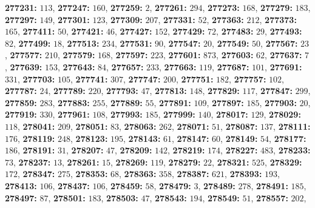\textsf{\bfseries 277231:} $113$, \textsf{\bfseries 277247:} $160$, \textsf{\bfseries 277259:} $2$, \textsf{\bfseries 277261:} $294$, \textsf{\bfseries 277273:} $168$, \textsf{\bfseries 277279:} $183$, \textsf{\bfseries 277297:} $149$, \textsf{\bfseries 277301:} $123$, \textsf{\bfseries 277309:} $207$, \textsf{\bfseries 277331:} $52$, \textsf{\bfseries 277363:} $212$, \textsf{\bfseries 277373:} $165$, \textsf{\bfseries 277411:} $50$, \textsf{\bfseries 277421:} $46$, \textsf{\bfseries 277427:} $152$, \textsf{\bfseries 277429:} $72$, \textsf{\bfseries 277483:} $29$, \textsf{\bfseries 277493:} $82$, \textsf{\bfseries 277499:} $18$, \textsf{\bfseries 277513:} $234$, \textsf{\bfseries 277531:} $90$, \textsf{\bfseries 277547:} $20$, \textsf{\bfseries 277549:} $50$, \textsf{\bfseries 277567:} $23$, \textsf{\bfseries 277577:} $210$, \textsf{\bfseries 277579:} $168$, \textsf{\bfseries 277597:} $223$, \textsf{\bfseries 277601:} $873$, \textsf{\bfseries 277603:} $62$, \textsf{\bfseries 277637:} $7$, \textsf{\bfseries 277639:} $153$, \textsf{\bfseries 277643:} $84$, \textsf{\bfseries 277657:} $233$, \textsf{\bfseries 277663:} $119$, \textsf{\bfseries 277687:} $101$, \textsf{\bfseries 277691:} $331$, \textsf{\bfseries 277703:} $105$, \textsf{\bfseries 277741:} $307$, \textsf{\bfseries 277747:} $200$, \textsf{\bfseries 277751:} $182$, \textsf{\bfseries 277757:} $102$, \textsf{\bfseries 277787:} $24$, \textsf{\bfseries 277789:} $220$, \textsf{\bfseries 277793:} $47$, \textsf{\bfseries 277813:} $148$, \textsf{\bfseries 277829:} $117$, \textsf{\bfseries 277847:} $299$, \textsf{\bfseries 277859:} $283$, \textsf{\bfseries 277883:} $255$, \textsf{\bfseries 277889:} $55$, \textsf{\bfseries 277891:} $109$, \textsf{\bfseries 277897:} $185$, \textsf{\bfseries 277903:} $20$, \textsf{\bfseries 277919:} $330$, \textsf{\bfseries 277961:} $108$, \textsf{\bfseries 277993:} $185$, \textsf{\bfseries 277999:} $140$, \textsf{\bfseries 278017:} $129$, \textsf{\bfseries 278029:} $118$, \textsf{\bfseries 278041:} $209$, \textsf{\bfseries 278051:} $83$, \textsf{\bfseries 278063:} $262$, \textsf{\bfseries 278071:} $51$, \textsf{\bfseries 278087:} $137$, \textsf{\bfseries 278111:} $176$, \textsf{\bfseries 278119:} $248$, \textsf{\bfseries 278123:} $195$, \textsf{\bfseries 278143:} $61$, \textsf{\bfseries 278147:} $60$, \textsf{\bfseries 278149:} $54$, \textsf{\bfseries 278177:} $186$, \textsf{\bfseries 278191:} $31$, \textsf{\bfseries 278207:} $47$, \textsf{\bfseries 278209:} $142$, \textsf{\bfseries 278219:} $174$, \textsf{\bfseries 278227:} $483$, \textsf{\bfseries 278233:} $73$, \textsf{\bfseries 278237:} $13$, \textsf{\bfseries 278261:} $15$, \textsf{\bfseries 278269:} $119$, \textsf{\bfseries 278279:} $22$, \textsf{\bfseries 278321:} $525$, \textsf{\bfseries 278329:} $172$, \textsf{\bfseries 278347:} $275$, \textsf{\bfseries 278353:} $68$, \textsf{\bfseries 278363:} $358$, \textsf{\bfseries 278387:} $621$, \textsf{\bfseries 278393:} $193$, \textsf{\bfseries 278413:} $106$, \textsf{\bfseries 278437:} $106$, \textsf{\bfseries 278459:} $58$, \textsf{\bfseries 278479:} $3$, \textsf{\bfseries 278489:} $278$, \textsf{\bfseries 278491:} $185$, \textsf{\bfseries 278497:} $87$, \textsf{\bfseries 278501:} $183$, \textsf{\bfseries 278503:} $47$, \textsf{\bfseries 278543:} $194$, \textsf{\bfseries 278549:} $51$, \textsf{\bfseries 278557:} $202$, 
